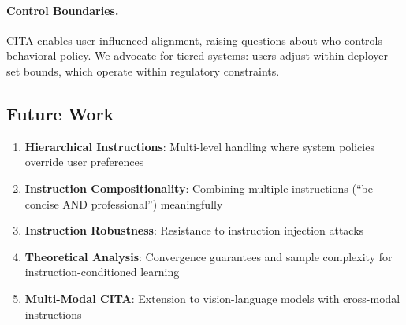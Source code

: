 \paragraph{Control Boundaries.} CITA enables user-influenced alignment, raising questions about who controls behavioral policy. We advocate for tiered systems: users adjust within deployer-set bounds, which operate within regulatory constraints.


\vspace{-2mm}
\subsection{Future Work}
\label{sec:future_work}

\begin{enumerate}[leftmargin=*,itemsep=2pt]
    \item \textbf{Hierarchical Instructions}: Multi-level handling where system policies override user preferences

    \item \textbf{Instruction Compositionality}: Combining multiple instructions (``be concise AND professional'') meaningfully

    \item \textbf{Instruction Robustness}: Resistance to instruction injection attacks

    \item \textbf{Theoretical Analysis}: Convergence guarantees and sample complexity for instruction-conditioned learning

    \item \textbf{Multi-Modal CITA}: Extension to vision-language models with cross-modal instructions
\end{enumerate}
